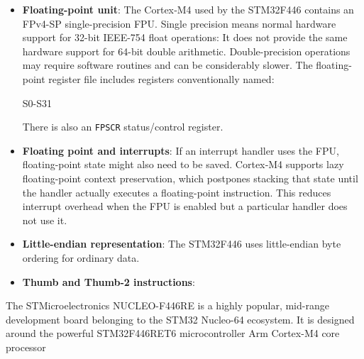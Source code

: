 \documentclass{report}
\begin{document}
\begin{itemize}
            If software violates a configured MPU rule, the processor normally raises a MemManage fault.
        \item \textbf{Floating-point unit}: The Cortex‑M4 used by the STM32F446 contains an FPv4-SP single-precision FPU.
            \bigbreak \noindent 
            Single precision means normal hardware support for 32-bit IEEE-754 float operations:
            \bigbreak \noindent 
            It does not provide the same hardware support for 64-bit double arithmetic. Double-precision operations may require software routines and can be considerably slower.
            \bigbreak \noindent 
            The floating-point register file includes registers conventionally named:
            \bigbreak \noindent 
            \begin{ccode}
            S0-S31
            \end{ccode}
            \bigbreak \noindent 
            There is also an \texttt{FPSCR} status/control register.
        \item \textbf{Floating point and interrupts}: If an interrupt handler uses the FPU, floating-point state might also need to be saved. Cortex‑M4 supports lazy floating-point context preservation, which postpones stacking that state until the handler actually executes a floating-point instruction.
            \bigbreak \noindent 
            This reduces interrupt overhead when the FPU is enabled but a particular handler does not use it.
        \item \textbf{Little-endian representation}: The STM32F446 uses little-endian byte ordering for ordinary data.
        \item \textbf{Thumb and Thumb‑2 instructions}: 




    \end{itemize}


    \pagebreak 
    The STMicroelectronics NUCLEO-F446RE is a highly popular, mid-range development board belonging to the STM32 Nucleo-64 ecosystem. It is designed around the powerful STM32F446RET6 microcontroller
    \bigbreak \noindent 
    Arm Cortex-M4 core processor

    \bigbreak \noindent 
\end{document}
